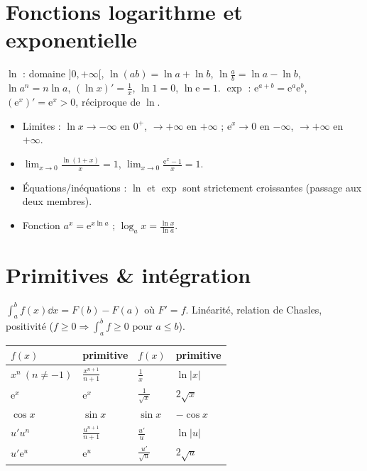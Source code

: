 \section{Fonctions logarithme et exponentielle}

\begin{aretenir}
$\ln$ : domaine $]0,+\infty[$, $\ln(ab)=\ln a+\ln b$, $\ln\frac ab=\ln a-\ln b$, $\ln a^n=n\ln a$,
$(\ln x)'=\frac1x$, $\ln1=0$, $\ln\mathrm{e}=1$. \quad $\exp$ : $\mathrm{e}^{a+b}=\mathrm{e}^a\mathrm{e}^b$,
$(\mathrm{e}^x)'=\mathrm{e}^x>0$, réciproque de $\ln$.
\end{aretenir}

\begin{itemize}
\item Limites : $\ln x\to-\infty$ en $0^+$, $\to+\infty$ en $+\infty$ ; $\mathrm{e}^x\to0$ en $-\infty$, $\to+\infty$ en $+\infty$.
\item $\lim_{x\to0}\frac{\ln(1+x)}x=1$, $\lim_{x\to0}\frac{\mathrm{e}^x-1}x=1$.
\item Équations/inéquations : $\ln$ et $\exp$ sont strictement croissantes (passage aux deux membres).
\item Fonction $a^x=\mathrm{e}^{x\ln a}$ ; $\log_a x=\frac{\ln x}{\ln a}$.
\end{itemize}

\section{Primitives \& intégration}

\begin{aretenir}
$\displaystyle\int_a^b f(x)\dd x=F(b)-F(a)$ où $F'=f$. Linéarité, relation de Chasles,
positivité ($f\ge0\Rightarrow\int_a^b f\ge0$ pour $a\le b$).
\end{aretenir}

\begin{center}\small
\begin{tabular}{@{}ll@{\qquad}ll@{}}
\toprule
$f(x)$ & primitive & $f(x)$ & primitive\\
\midrule
$x^n\ (n\ne-1)$ & $\frac{x^{n+1}}{n+1}$ & $\frac1x$ & $\ln|x|$\\
$\mathrm{e}^{x}$ & $\mathrm{e}^{x}$ & $\frac1{\sqrt x}$ & $2\sqrt x$\\
$\cos x$ & $\sin x$ & $\sin x$ & $-\cos x$\\
$u'u^n$ & $\frac{u^{n+1}}{n+1}$ & $\frac{u'}u$ & $\ln|u|$\\
$u'\mathrm{e}^{u}$ & $\mathrm{e}^{u}$ & $\frac{u'}{\sqrt u}$ & $2\sqrt u$\\
\bottomrule
\end{tabular}
\end{center}

